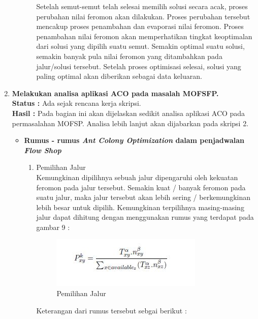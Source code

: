 \documentclass[a4paper,twoside]{article}
\begin{document}
\begin{enumerate}
\begin{itemize}
\begin{enumerate}
			Setelah semut-semut telah selesai memilih solusi secara acak, proses perubahan nilai feromon
			akan dilakukan. Proses perubahan tersebut mencakup proses penambahan dan evaporasi nilai
			feromon. Proses penambahan nilai feromon akan memperhatikan tingkat keoptimalan dari solusi
			yang dipilih suatu semut. Semakin optimal suatu solusi, semakin banyak pula nilai feromon yang
			ditambahkan pada jalur/solusi tersebut. Setelah proses optimisasi selesai, solusi yang paling optimal
			akan diberikan sebagai data keluaran.
			
		\end{enumerate}
	
		\end{itemize}
		
		\newpage
		\item \textbf{Melakukan analisa aplikasi ACO pada masalah MOFSFP.}\\
		{\bf Status :} Ada sejak rencana kerja skripsi.\\
		{\bf Hasil :} Pada bagian ini akan dijelaskan sedikit analisa aplikasi ACO pada permasalahan MOFSP. Analisa lebih lanjut akan dijabarkan pada skripsi 2.
		\begin{itemize}
			\item {\bf Rumus - rumus {\it Ant Colony Optimization} dalam penjadwalan {\it Flow Shop}}
			\begin{enumerate}
				\item Pemilihan Jalur\\
					  Kemungkinan dipilihnya sebuah jalur dipengaruhi oleh kekuatan feromon pada jalur tersebut. Semakin
					  kuat / banyak feromon pada suatu jalur, maka jalur tersebut akan lebih sering / berkemungkinan
					  lebih besar untuk dipilih. Kemungkinan terpilihnya masing-masing jalur dapat dihitung
					  dengan menggunakan rumus yang terdapat pada gambar 9 :
					  
					  \begin{figure}[H]
					  	\centering
					  	\includegraphics[scale=0.70]{gambar9}
					  	\caption[RumusJalur] {Pemilihan Jalur}
					  	\label{fig:rumusjalur}
					  \end{figure}
				  
				  	  Keterangan dari rumus tersebut sebgai berikut :
				  	  

\end{enumerate}
\end{itemize}
\end{enumerate}
\end{document}
